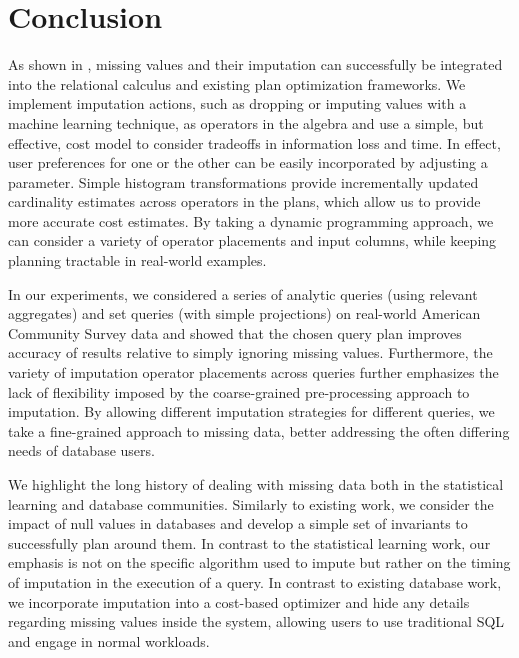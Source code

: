 \section{Conclusion}

As shown in \ProjectName{}, missing values and their imputation can successfully be integrated into the relational calculus and
existing plan optimization frameworks. We implement imputation actions, such as dropping or imputing values with a machine
learning technique, as operators in the algebra and use a simple, but effective, cost model to consider tradeoffs in 
information loss and time. In effect, user preferences for one or the other can be easily incorporated by adjusting a parameter.
Simple histogram transformations
provide incrementally updated cardinality estimates across operators in the plans, which allow us to provide more accurate cost estimates.
By taking a dynamic programming approach, we can consider a variety of operator placements
and input columns, while keeping planning tractable in real-world examples.

In our experiments, we considered a series of analytic queries (using relevant aggregates) and set queries (with simple projections) on real-world
American Community Survey data
and showed that the chosen query plan improves accuracy of results relative to simply ignoring missing values. Furthermore,
the variety of imputation operator placements across queries further emphasizes the lack of flexibility imposed by the coarse-grained
pre-processing approach to imputation. By allowing different imputation strategies for different queries, we
take a fine-grained approach to missing data, better addressing the often differing needs of database users.

We highlight the long history of dealing with missing data both in the statistical learning and database communities.
Similarly to existing work, we consider the impact of null values in databases and develop a simple set of invariants to 
successfully plan around them. In contrast to the statistical learning work, our emphasis is not on the specific algorithm
used to impute but rather on the timing of imputation in the execution of a query. In contrast to existing database work,
we incorporate imputation into a cost-based optimizer and hide any details
regarding missing values inside the system, allowing users to use traditional SQL and engage in normal workloads.

